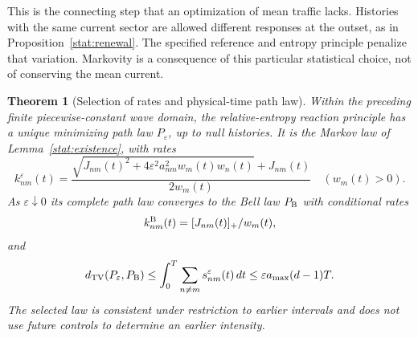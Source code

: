 \documentclass[11pt,oneside,openany]{book}
\newtheorem{theorem}{Theorem}[chapter]
\theoremstyle{definition}
\theoremstyle{remark}\newtheorem{remark}[theorem]{Remark}
\begin{document}
This is the connecting step that an optimization of mean traffic lacks.
Histories with the same current sector are allowed different responses at
the outset, as in Proposition~\ref{stat:renewal}. The specified reference
and entropy principle penalize that variation. Markovity is a consequence
of this particular statistical choice, not of conserving the mean current.

\begin{theorem}[Selection of rates and physical-time path law]
\label{stat:selection}
Within the preceding finite piecewise-constant wave domain, the
relative-entropy reaction principle has a unique minimizing path law
$P_\varepsilon$, up to null histories. It is the Markov law of
Lemma~\ref{stat:existence}, with rates
\begin{equation}\label{stat:selected-rate}
 k^\varepsilon_{nm}(t)=
 \frac{\sqrt{J_{nm}(t)^2+
       4\varepsilon^2a_{nm}^2w_m(t)w_n(t)}+J_{nm}(t)}{2w_m(t)}
 \quad(w_m(t)>0).
\end{equation}
As $\varepsilon\downarrow0$ its complete path law converges to the Bell law
$P_{\rm B}$ with conditional rates
\begin{equation}\label{stat:bell-rate}
 k^{\rm B}_{nm}(t)=[J_{nm}(t)]_+/w_m(t),
\end{equation}
and
\begin{equation}\label{stat:path-bound}
 d_{\rm TV}(P_\varepsilon,P_{\rm B})
 \leq\int_0^T\sum_{n\ne m}s^\varepsilon_{nm}(t)\,dt
 \leq\varepsilon a_{\max}(d-1)T.
\end{equation}
The selected law is consistent under restriction to earlier intervals and
does not use future controls to determine an earlier intensity.
\end{theorem}
\end{document}

